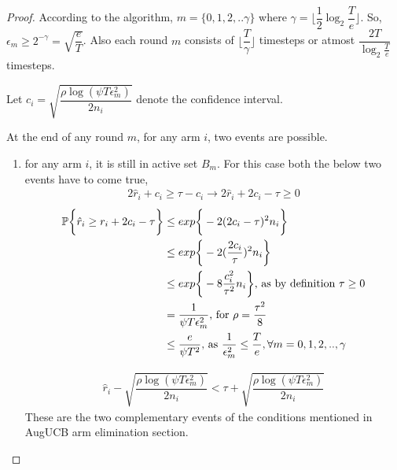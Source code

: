 \begin{proof}

According to the algorithm, $m=\lbrace 0,1,2,.. \gamma\rbrace $ where $\gamma=\big\lfloor \dfrac{1}{2}\log_{2} \dfrac{T}{e}\big\rfloor$. So, $\epsilon_{m}\geq 2^{-\gamma} = \sqrt{\dfrac{e}{T}}$. Also each round $m$ consists of $\lfloor \dfrac{T}{\gamma}\rfloor$ timesteps or atmost $\dfrac{2T}{\log_{2}\frac{T}{e}}$ timesteps.

Let $c_{i}= \sqrt{\dfrac{\rho\log{(\psi T\epsilon_{m}^{2})}}{2 n_{i}}}$ denote the confidence interval.

At the end of any round $m$, for any arm $i$, two events are possible.
\begin{enumerate}
\item for any arm $i$, it is still in active set $B_{m}$. For this case both the below two events have to come true,
\begin{align*}
2\hat{r}_{i} + c_{i} \geq \tau - c_{i} 
\rightarrow 2\hat{r}_{i} + 2c_{i} -\tau \geq 0
\end{align*}
\begin{align*}
\mathbb{P}\bigg\lbrace \hat{r}_{i} \geq r_{i} + 2c_{i} - \tau \bigg\rbrace 
&\leq exp\bigg\lbrace -2(2c_{i}-\tau)^{2} n_{i}  \bigg\rbrace\\
&\leq exp\bigg\lbrace -2(\frac{2c_{i}}{\tau})^{2} n_{i}  \bigg\rbrace\\
&\leq exp\bigg\lbrace -8\frac{c_{i}^{2}}{\tau^{2}} n_{i}  \bigg\rbrace \text{, as by definition } \tau \geq 0\\
&= \dfrac{1}{\psi T \epsilon_{m}^{2}} \text{, for } \rho=\dfrac{\tau^{2}}{8}\\
&\leq \dfrac{e}{\psi T^{2}} \text{, as } \dfrac{1}{\epsilon_{m}^{2}}\leq \dfrac{T}{e},  \forall m=0,1,2,..,\gamma
\end{align*}


\begin{align*}
\hat{r}_{i} - \sqrt{\dfrac{\rho\log{(\psi T\epsilon_{m}^{2})}}{2 n_{i}}}  < \tau +\sqrt{\dfrac{\rho\log{(\psi T\epsilon_{m}^{2})}}{2 n_{i}}} 
\end{align*}
These are the two complementary events of the conditions mentioned in AugUCB arm elimination section.


\end{enumerate}
\end{proof}
